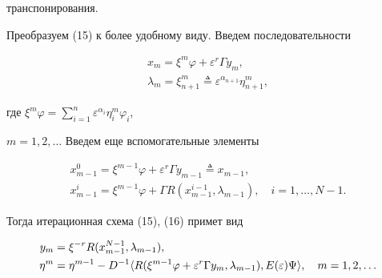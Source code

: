транспонирования.





Преобразуем (15) к более удобному виду. Введем последовательности


\begin{gather}


x_m = \xi^m\varphi + \varepsilon^r\Gamma y_m, \\


%


\lambda_m = \xi^m_{n+1} \triangleq


\varepsilon^{\alpha_{n+1}}\eta^m_{n+1},


\end{gather}


где $\xi^m\varphi=


\sum\limits^n_{i=1}\varepsilon^{\alpha_i}\eta^m_i\varphi_i$,


$m=1,2,\dotsc$ Введем еще вспомогательные элементы


\begin{gather}


x^0_{m-1} = \xi^{m-1}\varphi + \varepsilon^r\Gamma y_{m-1}


\triangleq x_{m-1},\\


%


x^i_{m-1} = \xi^{m-1}\varphi + \Gamma R(x_{m-1}^{i-1},\lambda_{m-1}), \quad


i=1,\dotsc,N-1.


\end{gather}


Тогда итерационная схема (15), (16) примет вид


\begin{equation}


\begin{split}


y_m &= \xi^{-r}R(x_{m-1}^{N-1},\lambda_{m-1}), \\


\eta^m &= \eta^{m-1} - D^{-1}\la R(\xi^{m-1}\varphi +


\varepsilon^r\Gamma y_m,\lambda_{m-


1}),E(\varepsilon)\Psi\ra, \quad m=1,2,\dotsc


\end{split}


\end{equation}





